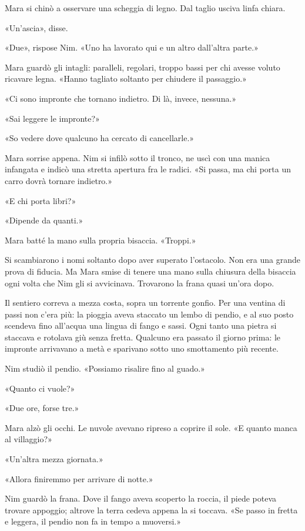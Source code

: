 \documentclass[10pt,a4paper]{article}
\begin{document}
Mara si chinò a osservare una scheggia di legno. Dal taglio usciva linfa chiara.

«Un'ascia», disse.

«Due», rispose Nim. «Uno ha lavorato qui e un altro dall'altra parte.»

Mara guardò gli intagli: paralleli, regolari, troppo bassi per chi avesse voluto ricavare legna. «Hanno tagliato soltanto per chiudere il passaggio.»

«Ci sono impronte che tornano indietro. Di là, invece, nessuna.»

«Sai leggere le impronte?»

«So vedere dove qualcuno ha cercato di cancellarle.»

Mara sorrise appena. Nim si infilò sotto il tronco, ne uscì con una manica infangata e indicò una stretta apertura fra le radici. «Si passa, ma chi porta un carro dovrà tornare indietro.»

«E chi porta libri?»

«Dipende da quanti.»

Mara batté la mano sulla propria bisaccia. «Troppi.»

Si scambiarono i nomi soltanto dopo aver superato l'ostacolo. Non era una grande prova di fiducia. Ma Mara smise di tenere una mano sulla chiusura della bisaccia ogni volta che Nim gli si avvicinava.
Trovarono la frana quasi un'ora dopo.

Il sentiero correva a mezza costa, sopra un torrente gonfio. Per una ventina di passi non c'era più: la pioggia aveva staccato un lembo di pendio, e al suo posto scendeva fino all'acqua una lingua di fango e sassi. Ogni tanto una pietra si staccava e rotolava giù senza fretta. Qualcuno era passato il giorno prima: le impronte arrivavano a metà e sparivano sotto uno smottamento più recente.

Nim studiò il pendio. «Possiamo risalire fino al guado.»

«Quanto ci vuole?»

«Due ore, forse tre.»

Mara alzò gli occhi. Le nuvole avevano ripreso a coprire il sole. «E quanto manca al villaggio?»

«Un'altra mezza giornata.»

«Allora finiremmo per arrivare di notte.»

Nim guardò la frana. Dove il fango aveva scoperto la roccia, il piede poteva trovare appoggio; altrove la terra cedeva appena la si toccava. «Se passo in fretta e leggera, il pendio non fa in tempo a muoversi.»
\end{document}
